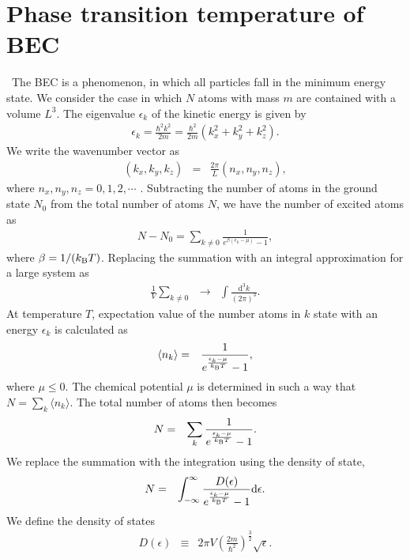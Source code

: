 \documentclass[12pt,a4paper]{report} %
\newcommand{\diff}{\mathrm{d}}				%
\newcommand{\kb} {k_{\rm B}}				%
\begin{document}
\section{Phase transition temperature of BEC}
\ The BEC is a phenomenon, in which all particles fall in the minimum energy state.
We consider the case in which $N$ atoms with mass $m$ are contained with a volume $L^3$.
The eigenvalue $\epsilon_k$ of the kinetic energy is given by
\begin{eqnarray}
\epsilon_k = \frac{\hbar^2 k^2}{2m} = \frac{\hbar^2}{2m}(k_x^2+k_y^2+k_z^2).
\end{eqnarray}
We write the wavenumber vector as
\begin{eqnarray}
(k_x, k_y, k_z) & = & \frac{2 \pi}{L}(n_x, n_y, n_z),
\end{eqnarray}
where $n_x,n_y,n_z = 0, 1, 2, \cdots$ .
Subtracting the number of atoms in the ground state $N_0$ from the total number of atoms $N$,
we have the number of excited atoms as
\begin{eqnarray}
N - N_0 = \sum_{k \neq 0} \frac{1}{ e^{\beta (\epsilon_k - \mu)} - 1},
\end{eqnarray}
where $\beta = 1/(\kb T)$.
Replacing the summation with an integral approximation for a large system as
\begin{eqnarray}
\frac{1}{V} \sum_{k \neq 0} & \rightarrow & \int \frac{\diff^3 k}{(2 \pi)^3}.
\end{eqnarray}
At temperature $T$, expectation value of the number atoms in $k$ state
with an energy $\epsilon_k$ is calculated as
\begin{eqnarray}
\langle n_k \rangle & = & \frac{1}{e^{\frac{\epsilon_k - \mu}{\kb T}} - 1},
\end{eqnarray}
where $\mu \leq 0$. The chemical potential $\mu$ is determined in
such a way that $N = \sum_k \langle n_k \rangle$.
The total number of atoms then becomes
\begin{eqnarray}
N & = & \sum_k \frac{1}{e^{\frac{\epsilon_k - \mu}{\kb T}} - 1}.
\end{eqnarray}
We replace the summation with the integration using the density of state,
\begin{eqnarray}
N & = & \int_{-\infty}^{\infty} \frac{ D(\epsilon)}{e^{\frac{\epsilon_k - \mu}{\kb T}} - 1}  \diff \epsilon.
\end{eqnarray}
We define the density of states
\begin{eqnarray}
D(\epsilon) & \equiv & 2 \pi V \left( \frac{2m}{\hbar^2} \right)^{\frac{3}{2}} \sqrt{\epsilon}.
\end{eqnarray}
\end{document}

